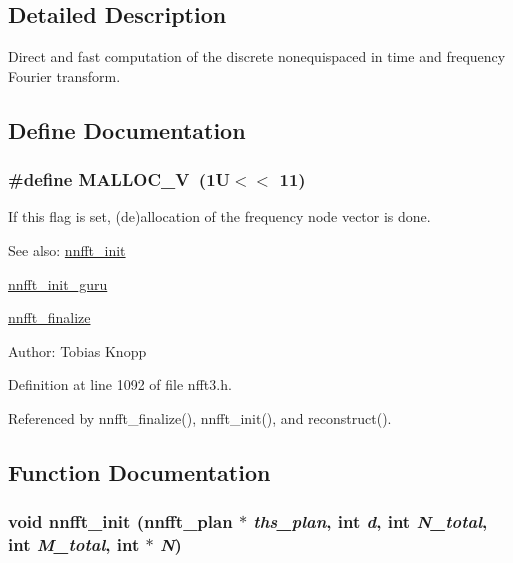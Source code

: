 \subsection{Detailed Description}
Direct and fast computation of the discrete nonequispaced in time and frequency Fourier transform. 

\subsection{Define Documentation}
\hypertarget{group__nnfft_gbfc80597fb6dcd28f3b9728bd7082642}{
\subsubsection{\setlength{\rightskip}{0pt plus 5cm}\#define MALLOC\_\-V~(1U$<$$<$ 11)}}
\label{group__nnfft_gbfc80597fb6dcd28f3b9728bd7082642}


If this flag is set, (de)allocation of the frequency node vector is done. 

\begin{Desc}
\item[See also:]\hyperlink{group__nnfft_g03fa16df51ea6c10e65baf058f109c52}{nnfft\_\-init} 

\hyperlink{group__nnfft_g75a2cb786f4cc4c87082c87a2c32046a}{nnfft\_\-init\_\-guru} 

\hyperlink{group__nnfft_g9b5bcde6c436f8fe0e8d8dc4fa7a4230}{nnfft\_\-finalize} \end{Desc}
\begin{Desc}
\item[Author:]Tobias Knopp \end{Desc}


Definition at line 1092 of file nfft3.h.

Referenced by nnfft\_\-finalize(), nnfft\_\-init(), and reconstruct().

\subsection{Function Documentation}
\hypertarget{group__nnfft_g03fa16df51ea6c10e65baf058f109c52}{
\subsubsection{\setlength{\rightskip}{0pt plus 5cm}void nnfft\_\-init ({\bf nnfft\_\-plan} $\ast$ {\em ths\_\-plan}, int {\em d}, int {\em N\_\-total}, int {\em M\_\-total}, int $\ast$ {\em N})}}
\label{group__nnfft_g03fa16df51ea6c10e65baf058f109c52}


